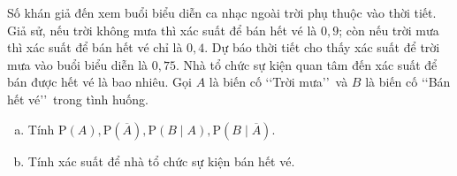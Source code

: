\begin{vd}%
		Số khán giả đến xem buổi biểu diễn ca nhạc ngoài trời phụ thuộc vào thời tiết. Giả sử, nếu trời không mưa thì xác suất để bán hết vé là $0{,}9$; còn nếu trời mưa thì xác suất để bán hết vé chỉ là $0{,}4$. Dự báo thời tiết cho thấy xác suất để trời mưa vào buổi biểu diễn là $0{,}75$. Nhà tổ chức sự kiện quan tâm đến xác suất để bán được hết vé là bao nhiêu.	
	Gọi $A$ là biến cố \lq \lq Trời mưa\rq \rq~và $B$ là biến cố \lq \lq Bán hết vé\rq \rq~trong tình huống.
	\begin{enumerate}[a)]
		\item Tính $\mathrm{P}(A), \mathrm{P}(\overline{A}), \mathrm{P}(B \mid A), \mathrm{P}(B \mid \overline{A})$.
		\item Tính xác suất để nhà tổ chức sự kiện bán hết vé.
	\end{enumerate}
\end{vd}

